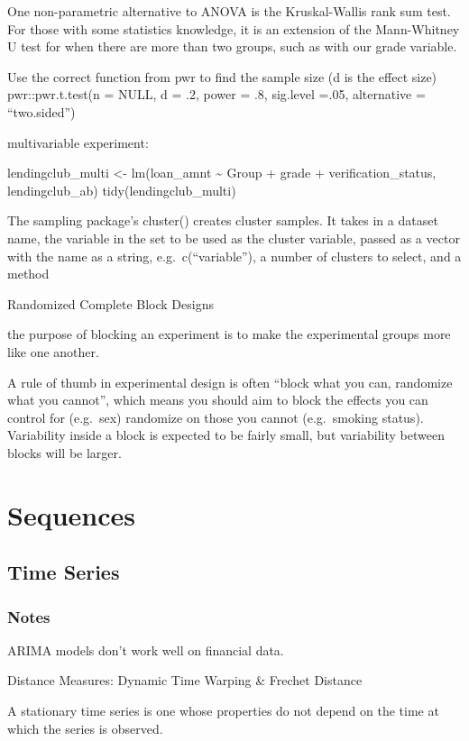 \documentclass[]{book}
\begin{document}
One non-parametric alternative to ANOVA is the Kruskal-Wallis rank sum
test. For those with some statistics knowledge, it is an extension of
the Mann-Whitney U test for when there are more than two groups, such as
with our grade variable.

Use the correct function from pwr to find the sample size (d is the
effect size) pwr::pwr.t.test(n = NULL, d = .2, power = .8, sig.level
=.05, alternative = ``two.sided'')

multivariable experiment:

lendingclub\_multi \textless{}- lm(loan\_amnt \textasciitilde{} Group +
grade + verification\_status, lendingclub\_ab) tidy(lendingclub\_multi)

The sampling package's cluster() creates cluster samples. It takes in a
dataset name, the variable in the set to be used as the cluster
variable, passed as a vector with the name as a string,
e.g.~c(``variable''), a number of clusters to select, and a method

Randomized Complete Block Designs

the purpose of blocking an experiment is to make the experimental groups
more like one another.

A rule of thumb in experimental design is often ``block what you can,
randomize what you cannot'', which means you should aim to block the
effects you can control for (e.g.~sex) randomize on those you cannot
(e.g.~smoking status). Variability inside a block is expected to be
fairly small, but variability between blocks will be larger.

\chapter{Sequences}\label{sequences}

\section{Time Series}\label{time-series}

\subsection{Notes}\label{notes}

ARIMA models don't work well on financial data.

Distance Measures: Dynamic Time Warping \& Frechet Distance

A stationary time series is one whose properties do not depend on the
time at which the series is observed.
\end{document}
